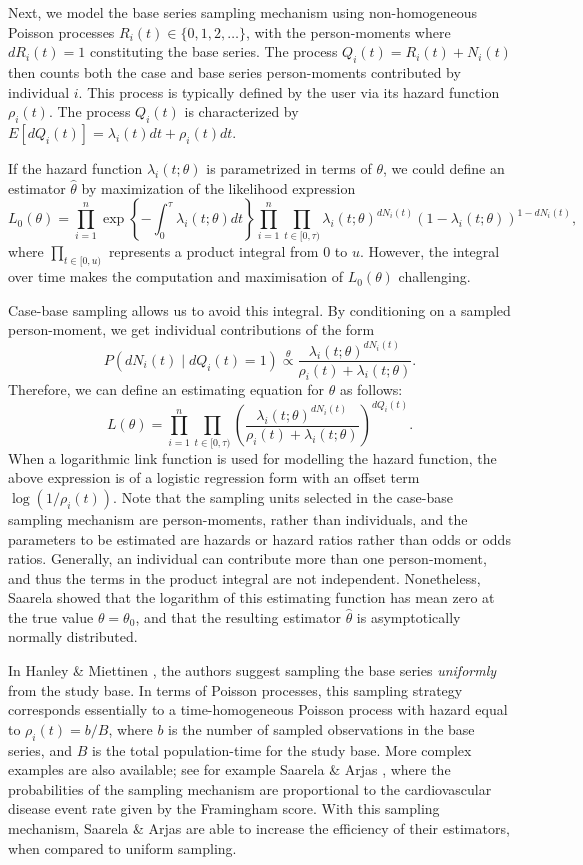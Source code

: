 \documentclass[
]{jss}
\begin{document}
Next, we model the base series sampling mechanism using non-homogeneous
Poisson processes \(R_i(t) \in \{0, 1, 2, \ldots\}\), with the
person-moments where \(dR_i(t) = 1\) constituting the base series. The
process \(Q_{i}(t) = R_i(t) + N_{i}(t)\) then counts both the case and
base series person-moments contributed by individual \(i\). This process
is typically defined by the user via its hazard function \(\rho_i(t)\).
The process \(Q_{i}(t)\) is characterized by
\(E[dQ_{i}(t)] = \lambda_{i}(t)dt + \rho_i(t)dt\).

If the hazard function \(\lambda_{i}(t; \theta)\) is parametrized in
terms of \(\theta\), we could define an estimator \(\hat{\theta}\) by
maximization of the likelihood expression
\[L_0(\theta) = \prod_{i=1}^n \exp\left\{ -\int_0^\tau \lambda_i(t; \theta) dt \right\} \prod_{i=1}^{n} \prod_{t\in[0,\tau)} \lambda_{i}(t;\theta)^{dN_{i}(t)}\left(1 - \lambda_{i}(t;\theta)\right)^{1 - dN_{i}(t)},\]
where \(\prod_{t\in[0,u)}\) represents a product integral from \(0\) to
\(u\). However, the integral over time makes the computation and
maximisation of \(L_0(\theta)\) challenging.

Case-base sampling allows us to avoid this integral. By conditioning on
a sampled person-moment, we get individual contributions of the form
\[P(dN_{i}(t) \mid dQ_{i}(t) = 1) \stackrel{\theta}{\propto} \frac{\lambda_{i}(t; \theta)^{dN_{i}(t)}}{\rho_i(t) + \lambda_{i}(t;\theta)}.\]
Therefore, we can define an estimating equation for \(\theta\) as
follows:
\[L(\theta) = \prod_{i=1}^{n} \prod_{t\in[0,\tau)} \left(\frac{\lambda_{i}(t; \theta)^{dN_{i}(t)}}{\rho_i(t) + \lambda_{i}(t;\theta)}\right)^{dQ_i(t)}.\]
When a logarithmic link function is used for modelling the hazard
function, the above expression is of a logistic regression form with an
offset term \(\log(1/\rho_i(t))\). Note that the sampling units selected
in the case-base sampling mechanism are person-moments, rather than
individuals, and the parameters to be estimated are hazards or hazard
ratios rather than odds or odds ratios. Generally, an individual can
contribute more than one person-moment, and thus the terms in the
product integral are not independent. Nonetheless, Saarela
\citeyearpar{saarela2016case} showed that the logarithm of this
estimating function has mean zero at the true value \(\theta=\theta_0\),
and that the resulting estimator \(\hat{\theta}\) is asymptotically
normally distributed.

In Hanley \& Miettinen \citeyearpar{hanley2009fitting}, the authors
suggest sampling the base series \emph{uniformly} from the study base.
In terms of Poisson processes, this sampling strategy corresponds
essentially to a time-homogeneous Poisson process with hazard equal to
\(\rho_i(t) = b/B\), where \(b\) is the number of sampled observations
in the base series, and \(B\) is the total population-time for the study
base. More complex examples are also available; see for example Saarela
\& Arjas \citeyearpar{saarela2015non}, where the probabilities of the
sampling mechanism are proportional to the cardiovascular disease event
rate given by the Framingham score. With this sampling mechanism,
Saarela \& Arjas are able to increase the efficiency of their
estimators, when compared to uniform sampling.
\end{document}
